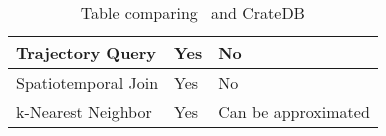 \begin{table}[h]
\begin{tabular}{|P{3.3cm}|P{6cm}|P{4cm}|}
		\hline
		Trajectory Query                  & Yes                                                                 & No                                                     \\
		\hline
		Spatiotemporal Join               & Yes                                                                 & No                                                \\
		\hline
		k-Nearest Neighbor                & Yes                                                                 & Can be approximated   \\
		\hline
	\end{tabular}
	\caption{Table comparing \mobilitydbc~and CrateDB}
	\label{tab:mobilitydb_vs_cratedb}
\end{table}





